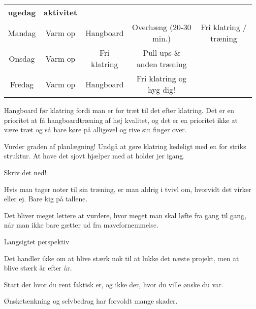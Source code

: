 
\begin{table}[h!]
  \centering\small
  \begin{tabular}{c| c c c c}
    \textbf{ugedag} & \textbf{aktivitet} & \\ \hline
    Mandag & Varm op & Hangboard & Overh\ae ng (20-30 min.) & Fri klatring / tr\ae ning \\
    Onsdag & Varm op & Fri klatring & Pull ups \& anden tr\ae ning & \\
    Fredag & Varm op & Hangboard & Fri klatring og hyg dig! & \\
  \end{tabular}
\end{table}
  \vspace{1em}
 
Hangboard før klatring fordi man er for træt til det efter klatring. Det er en prioritet at få hangboardtræning af høj kvalitet, og det er en prioritet ikke at være træt og så bare køre på alligevel og rive sin finger over.

Vurder graden af planl\ae gning! Undg{\aa} at gøre klatring kedeligt med en for striks struktur.
At have det sjovt hj\ae lper med at holder jer igang.
\vspace{2em}


\begin{multicols}{2}


  \begin{tList}{Skriv det ned!}
  \item Hvis man tager noter til sin træning, er man aldrig i tvivl
    om, hvorvidt det virker eller ej. Bare kig på tallene.
  \item Det bliver meget lettere at vurdere, hvor meget man skal
    løfte fra gang til gang, når man ikke bare gætter ud fra mavefornemmelse.
  \end{tList}

  \begin{tList}{Langsigtet perspektiv}
  \item Det handler ikke om at blive stærk nok til at lukke det næste
    projekt, men at blive stærk år efter år.
  \item Start der hvor du rent faktisk er, og ikke der, hvor du ville
    ønske du var.

  \item Ønsketænkning og selvbedrag har forvoldt mange skader.
  \end{tList}




\end{multicols}
